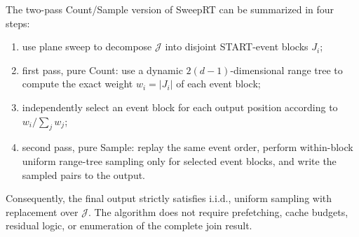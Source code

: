 \documentclass[11pt]{article}
\newcommand{\J}{\mathcal J}
\newcommand{\iid}{\mathrm{i.i.d.}}
\begin{document}
The two-pass Count/Sample version of SweepRT can be summarized in four steps:
\begin{enumerate}[leftmargin=2em]
  \item use plane sweep to decompose \(\J\) into disjoint START-event blocks \(J_i\);
  \item first pass, pure Count: use a dynamic \(2(d-1)\)-dimensional range tree to compute the exact weight \(w_i=|J_i|\) of each event block;
  \item independently select an event block for each output position according to \(w_i/\sum_j w_j\);
  \item second pass, pure Sample: replay the same event order, perform within-block uniform range-tree sampling only for selected event blocks, and write the sampled pairs to the output.
\end{enumerate}
Consequently, the final output strictly satisfies \(\iid\), uniform sampling with replacement over \(\J\). The algorithm does not require prefetching, cache budgets, residual logic, or enumeration of the complete join result.
\end{document}

